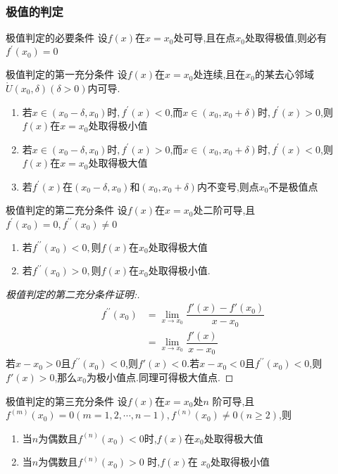 \documentclass[8pt a4paper, oneside, UTF8]{ctexbook}  %
\begin{document}
\begin{sloppypar}
    \subsubsection{极值的判定}
    \begin{defn}{极值判定的必要条件}{}
        设$f(x)$在$x=x_0$处可导,且在点$x_0$处取得极值,则必有$f^{\prime}(x_0)=0$
    \end{defn}
    \begin{defn}{极值判定的第一充分条件}{}
            设$f(x)$在$x=x_0$处连续,且在$x_0$的某去心邻域$\mathring U(x_0,\delta)(\delta>0)$内可导.
            \begin{enumerate}
                \item 若$x\in(x_0-\delta,x_0)$时$,f^\prime(x)<0$,而$x\in(x_0,x_0+\delta)$时$,f^\prime(x)>0$,则$f(x)$在$x=x_0$处取得极小值
                \item 若$x\in(x_0-\delta,x_0)$时$,f^\prime(x)>0$,而$x\in(x_0,x_0+\delta)$时$,f^\prime(x)<0$,则$f(x)$在$x=x_0$处取得极大值
                \item 若$f^\prime(x)$在$(x_0-\delta,x_0)$和$(x_0,x_0+\delta)$内不变号,则点$x_0$不是极值点
            \end{enumerate}
    \end{defn}
    \begin{defn}{极值判定的第二充分条件}{}
        设$f(x)$在$x=x_0$处二阶可导,且$f^\prime(x_{0})=0,f^{\prime\prime}(x_{0})\neq0$ 
        \begin{enumerate}
            \item 若$f^{\prime\prime}(x_{0})<0,则f(x)$在$x_0$处取得极大值
            \item 若$f^{\prime\prime}(x_{0})>0,则f(x)$在$x_{0}$处取得极小值.
        \end{enumerate}
        \begin{proof}[极值判定的第二充分条件证明:]
            \begin{align*}
              f^{\prime\prime} (x_0)& =  \lim_{x\to x_0} \dfrac{f'(x)-f'(x_0)}{x-x_0} \\
              & =   \lim_{x\to x_0} \dfrac{f'(x)}{x-x_0} 
            \end{align*}
            若$x-x_0>0$且$f^{\prime\prime} (x_0)<0$,则$f'(x)<0$.若$x-x_0<0$且$f^{\prime\prime} (x_0)<0$,则$f'(x)>0$,那么$x_0$为极小值点.同理可得极大值点.
        \end{proof}
    \end{defn}
    \begin{defn}{极值判定的第三充分条件}{}
        设$f(x)$在$x=x_0$处$n$ 阶可导,且$f^{(m)}(x_0)=0(m=1,2,\cdots,n-1),f^{(n)}(x_0)\neq0(n\geqslant2)$,则
        \begin{enumerate}
            \item 当$n$为偶数且$f^{(n)}(x_0)<0$时,$f(x)$在$x_0$处取得极大值
            \item 当$n$为偶数且$f^{(n)}(x_0)>0$ 时,$f(x)$在 $x_0$处取得极小值
        \end{enumerate}
    \end{defn}

\end{sloppypar}
\end{document}

